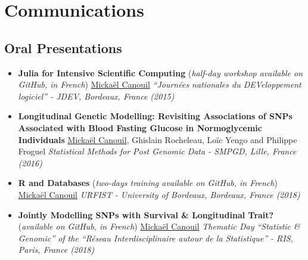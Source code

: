\documentclass[11pt,a4paper,sans]{moderncv}
\begin{document}
\section{Communications}
\subsection{Oral Presentations}
\begin{itemize}
    \setlength{\itemsep}{0.5em}

    \item \textbf{Julia for Intensive Scientific Computing} (\textit{half-day workshop available on GitHub, in French})
        \newline \underline{Mickaël Canouil}
        \newline \textit{``Journées nationales du DEVeloppement logiciel'' - JDEV, Bordeaux, France (2015)}

    \item \textbf{Longitudinal Genetic Modelling: Revisiting Associations of SNPs Associated with Blood Fasting Glucose in Normoglycemic Individuals}
        \newline \underline{Mickaël Canouil}, Ghislain Rocheleau, Loïc Yengo and Philippe Froguel
        \newline \textit{Statistical Methods for Post Genomic Data - SMPGD, Lille, France (2016)}
    
    \item \textbf{R and Databases} (\textit{two-days training available on GitHub, in French})
        \newline \underline{Mickaël Canouil}
        \newline \textit{URFIST - University of Bordeaux, Bordeaux, France (2018)}
        
    \item \textbf{Jointly Modelling SNPs with Survival \& Longitudinal Trait?} (\textit{available on GitHub, in French})
        \newline \underline{Mickaël Canouil}
        \newline \textit{Thematic Day ``Statistic \& Genomic'' of the ``Réseau Interdisciplinaire autour de la Statistique'' - RIS, Paris, France (2018)}

\end{itemize}
\end{document}
